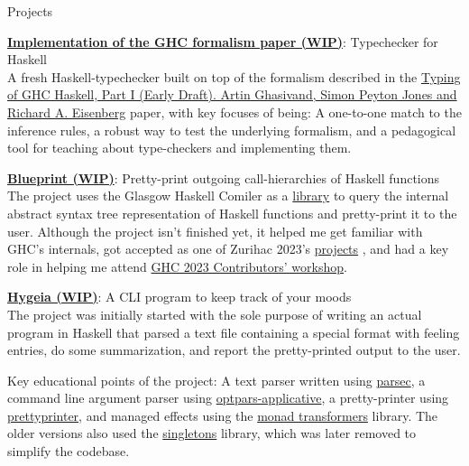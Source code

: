 \documentclass[
	a4paper,
	11pt,
]{resume}
\begin{document}
\begin{rSection}{Projects}

  \href{https://gitlab.haskell.org/Ei30metry/haskell}{\textbf{Implementation of the GHC formalism paper (WIP)}}: Typechecker for Haskell \\
  A fresh Haskell-typechecker built on top of the formalism described in the
  \href{https://gitlab.haskell.org/Ei30metry/haskell/-/jobs/artifacts/wip/term/raw/haskell.pdf?job=build-pdf}
  {Typing of GHC Haskell, Part I (Early Draft). Artin Ghasivand, Simon Peyton Jones and Richard A. Eisenberg} paper, with key focuses of being:
  A one-to-one match to the inference rules,
  a robust way to test the underlying formalism,
  and a pedagogical tool for teaching about type-checkers and implementing them.

  \href{https://github.com/Ei30metry/blueprint}{\textbf{Blueprint (WIP)}}: Pretty-print outgoing call-hierarchies of Haskell functions \\
  The project uses the Glasgow Haskell Comiler as a \href{https://hackage.haskell.org/package/ghc}{library} to query the internal
  abstract syntax tree representation of Haskell functions and pretty-print it to the user.
  Although the project isn't finished yet, it helped me get familiar with GHC's internals, got accepted as one of Zurihac 2023's \href{https://zfoh.ch/zurihac2023/projects/}{projects}
  , and had a key role in helping me attend \href{https://haskell.foundation/events/2023-ghc-development-workshop.html}{GHC 2023 Contributors' workshop}.

  \href{https://github.com/Ei30metry/Hygeia}{\textbf{Hygeia (WIP)}}: A CLI program to keep track of your moods \\
  The project was initially started with the sole purpose of writing an actual program in Haskell that parsed
  a text file containing a special format with feeling entries, do some summarization, and report the pretty-printed
  output to the user.

  Key educational points of the project: A text parser written using \href{https://hackage.haskell.org/package/parsec}{parsec},
  a command line argument parser using \href{https://hackage.haskell.org/package/optparse-applicative}{optpars-applicative},
  a pretty-printer using \href{https://hackage.haskell.org/package/prettyprinter}{prettyprinter},
  and managed effects using the \href{https://hackage.haskell.org/package/mtl}{monad transformers} library.
  The older versions also used the \href{https://hackage.haskell.org/package/singletons}{singletons} library, which was later removed to simplify the codebase.
\end{rSection}
\end{document}
